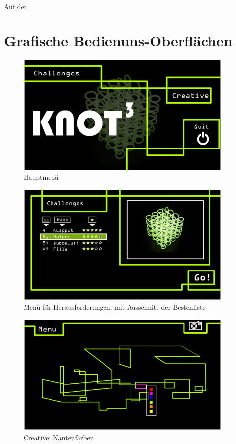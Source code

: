 Auf der 

\clearpage

\section{Grafische Bedienuns-Oberflächen}

	\begin{figure}[ht]
	  \centering
	  \includegraphics[width = 0.95\textwidth]{Systemmodelle/01_Knot3-mainscreen.png}
	  \caption{Hauptmenü}
	\end{figure}

	\begin{figure}[ht]
	  \centering
	  \includegraphics[width = 0.95\textwidth]{Systemmodelle/04_Knot3-select-Challenge.png}
	  \caption{Menü für Herausforderungen, mit Ausschnitt der Bestenliste}
	\end{figure}
	
	\begin{figure}[ht]
	  \centering
	  \includegraphics[width = 0.95\textwidth]{Systemmodelle/05_Knot3-Colour-select.png}
	  \caption{Creative: Kantenfärben}
	\end{figure}
	
